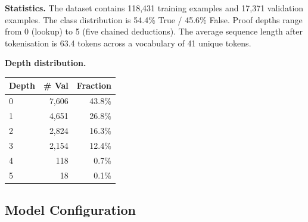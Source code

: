 \documentclass[conference]{IEEEtran}
\begin{document}
\textbf{Statistics.} The dataset contains 118,431 training
examples and 17,371 validation examples.  The class distribution
is 54.4\% True / 45.6\% False.  Proof depths range from 0
(lookup) to 5 (five chained deductions).  The average sequence
length after tokenisation is 63.4 tokens across a vocabulary of
41 unique tokens.

\textbf{Depth distribution.}
\begin{center}
\small
\begin{tabular}{@{}lrr@{}}
\toprule
Depth & \# Val & Fraction \\
\midrule
0 & 7,606 & 43.8\% \\
1 & 4,651 & 26.8\% \\
2 & 2,824 & 16.3\% \\
3 & 2,154 & 12.4\% \\
4 & 118 & 0.7\% \\
5 & 18 & 0.1\% \\
\bottomrule
\end{tabular}
\end{center}

\subsection{Model Configuration}
\end{document}
